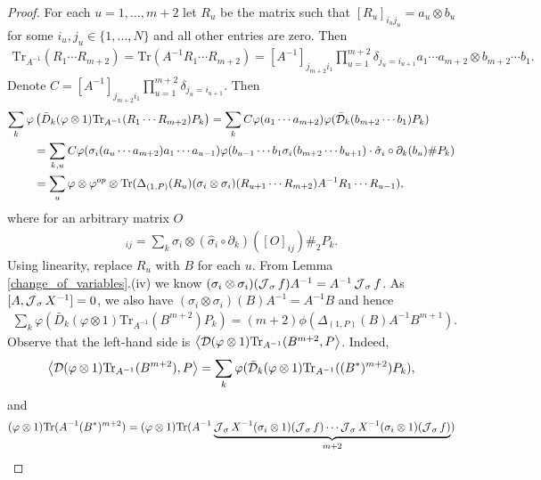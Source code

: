 \begin{proof}
For each $u=1,\ldots, m+2$ let $R_u$ be the matrix such that $[R_u]_{i_uj_u}=a_u\otimes b_u$ for some $i_u, j_u\in\{1,\ldots, N\}$ and all other entries are zero. Then
	\begin{align*}
		\text{Tr}_{A^{-1}}( R_1\cdots R_{m+2})=\text{Tr}(A^{-1}R_1\cdots R_{m+2})= [A^{-1}]_{j_{m+2}i_1}\prod_{u=1}^{m+2}\delta_{j_u=i_{u+1}} a_1\cdots a_{m+2}\otimes b_{m+2}\cdots b_1.
	\end{align*}
Denote $C=[A^{-1}]_{j_{m+2}i_1}\prod_{u=1}^{m+2}\delta_{j_u=i_{u+1}}$. Then
	\begin{align*}
		\sum_{k}\varphi &\left(\bar{D}_k(\varphi\otimes 1)\text{Tr}_{A^{-1}}(R_1\cdots R_{m+2}) P_k\right)= \sum_{k}C \varphi(a_1\cdots a_{m+2}) \varphi( \bar{\mathcal D}_k(b_{m+2}\cdots b_1) P_k)\\
		&=\sum_{k,u} C \varphi(\sigma_i(a_u\cdots a_{m+2})a_1\cdots a_{u-1}) \varphi( b_{u-1}\cdots b_1\sigma_i(b_{m+2}\cdots b_{u+1})\cdot \hat{\sigma}_i\circ\partial_k(b_u)\# P_k)\\
		&=\sum_{u} \varphi\otimes\varphi^{op}\otimes\text{Tr} ( \Delta_{(1,P)}(R_u) (\sigma_i\otimes\sigma_i)(R_{u+1}\cdots R_{m+2})A^{-1}R_1\cdots R_{u-1}),
	\end{align*}
where for an arbitrary matrix $O$
	\begin{align*}
		[\Delta_{(1,P)}(O)]_{ij}=\sum_k \sigma_{i}\otimes(\hat{\sigma}_i\circ\partial_k)([O]_{ij})\#_2 P_k.
	\end{align*}
Using linearity, replace $R_u$ with $B$ for each $u$. From Lemma \ref{change_of_variables}.(iv) we know $(\sigma_i\otimes\sigma_i)(\operatorname{\mathcal J}_\sigma f) A^{-1}=A^{-1}\operatorname{\mathcal J}_\sigma f$. As $[A,\operatorname{\mathcal J}_\sigma X^{-1}]=0$, we also have $(\sigma_i\otimes\sigma_i)(B)A^{-1}=A^{-1}B$ and hence
	\begin{align*}
		\sum_{k}\varphi\left(\bar{D}_k(\varphi\otimes 1)\text{Tr}_{A^{-1}}(B^{m+2}) P_k\right)
		=(m+2)\phi(\Delta_{(1,P)}(B)A^{-1}B^{m+1}).
	\end{align*}
Observe that the left-hand side is $\left\langle\mathcal D(\varphi\otimes 1)\text{Tr}_{A^{-1}}(B^{m+2}, P\right\rangle$. Indeed,
	\begin{align*}
		\left\langle\mathcal D(\varphi\otimes 1)\text{Tr}_{A^{-1}}(B^{m+2}), P\right\rangle =\sum_k \varphi( \bar{\mathcal D}_k (\varphi\otimes 1)\text{Tr}_{A^{-1}}((B^*)^{m+2}) P_k),
	\end{align*}
and
	\begin{align*}
		(\varphi\otimes 1)\text{Tr}(A^{-1} (B^*)^{m+2})&=(\varphi\otimes1)\text{Tr}(A^{-1} \underbrace{\J_\sigma X^{-1} (\sigma_i\otimes 1)(\J_\sigma f) \cdots \J_\sigma X^{-1} (\sigma_i\otimes 1)(\J_\sigma f)}_{m+2})\\

\end{align*}
\end{proof}
